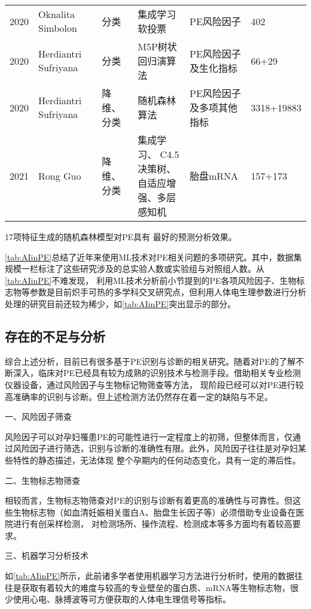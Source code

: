 \begin{landscape}
\begin{longtable}{m{1cm}<{\centering}m{4cm}<{\centering}m{3cm}<{\centering}m{5.5cm}<{\centering}m{5.5cm}<{\centering}m{2cm}<{\centering}}
        2020&Oknalita Simbolon\cite{Simbolon2020}&分类&集成学习软投票&PE风险因子&402\\
        2020&Herdiantri Sufriyana\cite{Sufriyana2020-1}&分类&M5P树状回归演算法&PE风险因子及生化指标&66+29\\
        2020&Herdiantri Sufriyana\cite{Sufriyana2020}&降维、分类&随机森林算法&PE风险因子及多项其他指标&3318+19883\\
        2021&Rong Guo\cite{Guo2021}&降维、分类&\tabincell{c}{集成学习、 C4.5决策树、\\自适应增强、多层感知机}&胎盘mRNA&157+173\\
	\end{longtable}
\end{landscape}

\noindent
17项特征生成的随机森林模型对PE具有
最好的预测分析效果。

\autoref{tab:AIinPE}总结了近年来使用ML技术对PE相关问题的多项研究。其中，数据集规模一栏标注了这些研究涉及的总实验人数或实验组与对照组人数。从\autoref{tab:AIinPE}不难发现，
利用ML技术分析前小节提到的PE各项风险因子、生物标志物等参数是目前炽手可热的多学科交叉研究点，但利用人体电生理参数进行分析处理的研究目前还较为稀少，如\autoref{tab:AIinPE}突出显示的部分。

\subsection{存在的不足与分析}
综合上述分析，目前已有很多基于PE识别与诊断的相关研究。随着对PE的了解不断深入，临床对PE已经具有较为成熟的识别技术与检测手段。借助相关专业检测仪器设备，通过风险因子与生物标记物筛查等方法，
现阶段已经可以对PE进行较高准确率的识别与诊断。但上述检测方法仍然存在着一定的缺陷与不足。

一、风险因子筛查

风险因子可以对孕妇罹患PE的可能性进行一定程度上的初筛，但整体而言，仅通过风险因子进行筛选，识别与诊断的准确性有限。此外，风险因子往往是对孕妇某些特性的静态描述，无法体现
整个孕期内的任何动态变化，具有一定的滞后性。

二、生物标志物筛查

相较而言，生物标志物筛查对PE的识别与诊断有着更高的准确性与可靠性。但这些生物标志物（如血清妊娠相关蛋白A、胎盘生长因子等）必须借助专业设备在医院进行有创采样检测，
对检测场所、操作流程、检测成本等多方面均有着较高要求。

三、机器学习分析技术

如\autoref{tab:AIinPE}所示，此前诸多学者使用机器学习方法进行分析时，使用的数据往往是获取有着较大的难度与较高的专业壁垒的蛋白质、mRNA等生物标志物，很少使用心电、脉搏波等可方便获取的人体电生理信号等指标。

